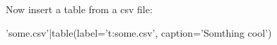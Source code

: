 
Now insert a table from a csv file:

{{ 'some.csv'|table(label='t:some.csv', caption='Somthing cool') }}

